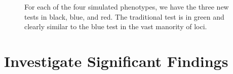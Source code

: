 \documentclass[9pt,twocolumn,twoside]{gsag3jnl}
\begin{document}
\begin{figure}
    \caption{For each of the four simulated phenotypes, we have the three new tests in black, blue, and red.  The traditional test is in green and clearly similar to the blue test in the vast manority of loci. \label{fig:empir_p_scans}}
\end{figure}







\section*{Investigate Significant Findings}





\end{document}
